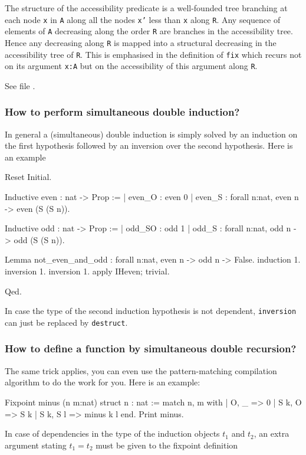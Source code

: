 \documentclass[a4paper,pdftex]{article}
\def\Question#1{\stepcounter{question}\subsubsection{#1}}
\newcommand\vfile[2]{\ahref{#1}{\tt {#2}.v}}
\begin{document}
The structure of the accessibility predicate is a well-founded tree
branching at each node {\tt x} in {\tt A} along all the nodes {\tt x'}
less than {\tt x} along {\tt R}. Any sequence of elements of {\tt A}
decreasing along the order {\tt R} are branches in the accessibility
tree. Hence any decreasing along {\tt R} is mapped into a structural
decreasing in the accessibility tree of {\tt R}. This is emphasised in
the definition of {\tt fix} which recurs not on its argument {\tt x:A}
but on the accessibility of this argument along {\tt R}.

See file \vfile{\InitWf}{Wf}.

\Question{How to perform simultaneous double induction?}

 In general a (simultaneous) double induction is simply solved by an
induction on the first hypothesis followed by an inversion over the
second hypothesis. Here is an example

\begin{coq_eval}
Reset Initial.
\end{coq_eval}

\begin{coq_example}
Inductive even : nat -> Prop :=
  | even_O : even 0
  | even_S : forall n:nat, even n -> even (S (S n)).

Inductive odd : nat -> Prop :=
  | odd_SO : odd 1
  | odd_S : forall n:nat, odd n -> odd (S (S n)).

Lemma not_even_and_odd : forall n:nat, even n -> odd n -> False.
induction 1.
  inversion 1.
  inversion 1. apply IHeven; trivial.
\end{coq_example}
\begin{coq_eval}
Qed.
\end{coq_eval}

In case the type of the second induction hypothesis is not
dependent, {\tt inversion} can just be replaced by {\tt destruct}.

\Question{How to define a function by simultaneous double recursion?}

 The same trick applies, you can even use the pattern-matching
compilation algorithm to do the work for you. Here is an example:

\begin{coq_example}
Fixpoint minus (n m:nat) {struct n} : nat :=
  match n, m with
  | O, _ => 0
  | S k, O => S k
  | S k, S l => minus k l
  end.
Print  minus.
\end{coq_example}

In case of dependencies in the type of the induction objects
$t_1$ and $t_2$, an extra argument stating $t_1=t_2$ must be given to
the fixpoint definition
\end{document}
